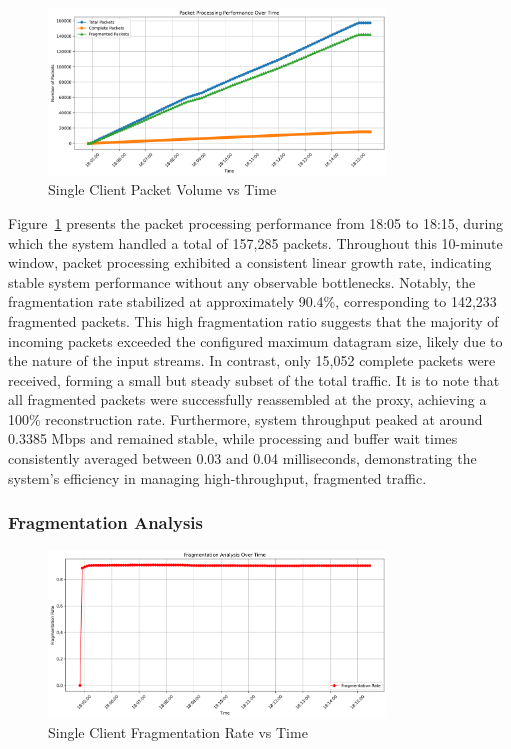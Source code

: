 \begin{figure}[h!]
\centering
\includegraphics[width=0.8\textwidth]{Evaluation/single_packet_processing_performance.png}
\caption{Single Client Packet Volume vs Time}
\label{fig:single-packet-performance}
\end{figure}

Figure~\ref{fig:single-packet-performance} presents the packet processing performance from 18:05 to 18:15, during which the system handled a total of 157,285 packets. Throughout this 10-minute window, packet processing exhibited a consistent linear growth rate, indicating stable system performance without any observable bottlenecks. Notably, the fragmentation rate stabilized at approximately 90.4\%, corresponding to 142,233 fragmented packets. This high fragmentation ratio suggests that the majority of incoming packets exceeded the configured maximum datagram size, likely due to the nature of the input streams. In contrast, only 15,052 complete packets were received, forming a small but steady subset of the total traffic. It is to note that all fragmented packets were successfully reassembled at the proxy, achieving a 100\% reconstruction rate. Furthermore, system throughput peaked at around 0.3385 Mbps and remained stable, while processing and buffer wait times consistently averaged between 0.03 and 0.04 milliseconds, demonstrating the system's efficiency in managing high-throughput, fragmented traffic.


\subsubsection{Fragmentation Analysis}

\begin{figure}[h!]
\centering
\includegraphics[width=0.8\textwidth]{Evaluation/single_fragmentation_analysis.png}
\caption{Single Client Fragmentation Rate vs Time}
\label{fig:fragmentation-analysis}
\end{figure}

